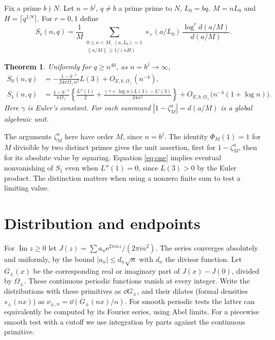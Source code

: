 \documentclass[11pt]{article}
\newtheorem{theorem}{Theorem}[section]
\newcommand{\e}{\mathrm e}\newcommand{\im}{\operatorname{Im}}\newcommand{\re}{\operatorname{Re}}
\begin{document}
Fix a prime \(b\nmid N\). Let \(n=b^j\), \(q\ne b\) a prime prime to \(N\),
\(L_0=bq,\ M=nL_0\) and \(H=\lceil q^{1/8}\rceil\).
For \(r=0,1\) define
\[
 S_r(n,q)=\frac1M
 \sum_{\substack{0\le a<M,\ (a,L_0)=1\\ \|a/M\|\ge 1/(nH)}}
 s_+(a/L_0)\,\frac{\log^r d(a/M)}{d(a/M)} .
\]
\begin{theorem}\label{th:main}
Uniformly for \(q\ge n^{40}\), as \(n=b^j\to\infty\),
\begin{align}
 S_0(n,q)&=-\frac{1-b^{-1}}{24\pi\Omega_+n^2}L(3)+O_{E,b,\Omega_+}(n^{-4}),\label{eq:zero}\\
 S_1(n,q)&=\frac{1-b^{-1}}{\pi\Omega_+}
 \left\{\frac{L''(1)}{2}+
 \frac{(\gamma+\log n)L(3)-L'(3)}{24n^2}\right\}
 +O_{E,b,\Omega_+}\bigl(n^{-4}(1+\log n)\bigr).\label{eq:one}
\end{align}
Here \(\gamma\) is Euler's constant. For each summand \(|1-\zeta_M^a|=d(a/M)\)
is a global algebraic unit.
\end{theorem}
The arguments \(\zeta_M^a\) here have order \(M\), since \(n=b^j\).
The identity \(\Phi_M(1)=1\) for \(M\) divisible by two distinct primes
gives the unit assertion, first for \(1-\zeta_M^a\), then for its absolute
value by squaring. Equation \eqref{eq:one} implies eventual nonvanishing
of \(S_1\) even when \(L''(1)=0\), since \(L(3)>0\) by the Euler product.
The distinction matters when using a nonzero finite sum to test a limiting value.

\section{Distribution and endpoints}
For \(\im z\ge0\) let \(J(z)=\sum a_n\e^{2\pi inz}/(2\pi i n^2)\).
The series converges absolutely and uniformly, by the bound
\(|a_n|\le d_n\sqrt n\) with \(d_n\) the divisor function.
Let \(G_\pm(x)\) be the corresponding real or imaginary part of
\(J(x)-J(0)\), divided by \(\Omega_\pm\). These continuous periodic
functions vanish at every integer. Write the distributions with these
primitives as \(\dd G_\pm\), and their dilates (formal densities
\(s_\pm(nx)\)) as \(\nu_{\pm,n}=\dd(G_\pm(nx)/n)\).
For smooth periodic tests the latter can equivalently be computed by its
Fourier series, using Abel limits. For a piecewise smooth test with a
cutoff we use integration by parts against the continuous primitive.
\end{document}
